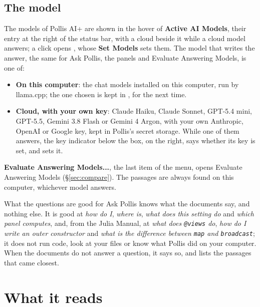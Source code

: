 \subsection{The model}
The models of Pollis AI+ are shown in the hover of \textbf{Active AI Models}, their entry at the right of the status bar,
with a cloud beside it while a cloud model answers; a click opens , whose \textbf{Set Models}
sets them. The model that writes the answer, the same for Ask Pollis, the panels and Evaluate Answering Models, is one of:
\begin{itemize}
  \item \textbf{On this computer}: the chat models installed on this computer, run by llama.cpp; the one chosen is kept
    in , for the next time.
  \item \textbf{Cloud, with your own key}: Claude Haiku, Claude Sonnet, GPT-5.4 mini, GPT-5.5, Gemini 3.8 Flash or Gemini 4 Argon,
    with your own Anthropic, OpenAI or Google key, kept in Pollis's secret storage. While one of them answers, the key
    indicator below the box, on the right, says whether its key is set, and sets it.
\end{itemize}
\textbf{Evaluate Answering Models...}, the last item of the menu, opens Evaluate Answering Models (\S\ref{sec:compare}).
The passages are always found on this computer, whichever model answers.

\begin{pbox}{What the questions are good for}
Ask Pollis knows what the documents say, and nothing else. It is good at \emph{how do I}, \emph{where is},
\emph{what does this setting do} and \emph{which panel computes}, and, from the Julia Manual, at \emph{what does
\texttt{@views} do}, \emph{how do I write an outer constructor} and \emph{what is the difference between
\texttt{map} and \texttt{broadcast}}; it does not run code, look at your files or know
what Pollis did on your computer. When the documents do not answer a question, it says so, and lists the passages that
came closest.
\end{pbox}

\section{What it reads}\label{sec:reads}

